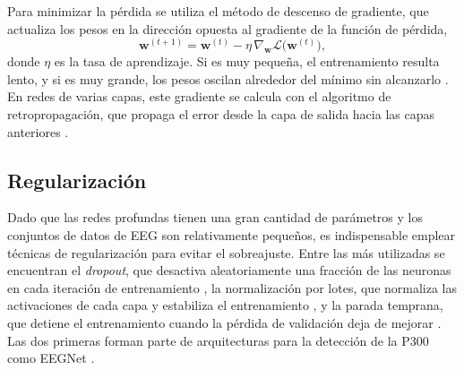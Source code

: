 Para minimizar la pérdida se utiliza el método de descenso de gradiente, que actualiza los pesos
en la dirección opuesta al gradiente de la función de pérdida,
\begin{equation}
\mathbf{w}^{(t+1)} = \mathbf{w}^{(t)} - \eta\, \nabla_{\mathbf{w}}\mathcal{L}\big(\mathbf{w}^{(t)}\big),
\label{eq:gradiente}
\end{equation}
donde $\eta$ es la tasa de aprendizaje. Si es muy pequeña, el entrenamiento resulta lento, y si es
muy grande, los pesos oscilan alrededor del mínimo sin alcanzarlo \cite{goodfellow2016}. En redes de
varias capas, este gradiente se calcula con el algoritmo de retropropagación, que propaga el error
desde la capa de salida hacia las capas anteriores \cite{rumelhart1986}.

\subsection{Regularización}

Dado que las redes profundas tienen una gran cantidad de parámetros y los conjuntos de datos de EEG
son relativamente pequeños, es indispensable emplear técnicas de regularización para evitar el
sobreajuste. Entre las más utilizadas se encuentran el \textit{dropout}, que desactiva
aleatoriamente una fracción de las neuronas en cada iteración de entrenamiento
\cite{srivastava2014}, la normalización por lotes, que normaliza las activaciones de cada capa y
estabiliza el entrenamiento \cite{ioffe2015}, y la parada temprana, que detiene el entrenamiento
cuando la pérdida de validación deja de mejorar \cite{goodfellow2016}. Las dos primeras forman
parte de arquitecturas para la detección de la P300 como EEGNet \cite{lawhern2018}.


